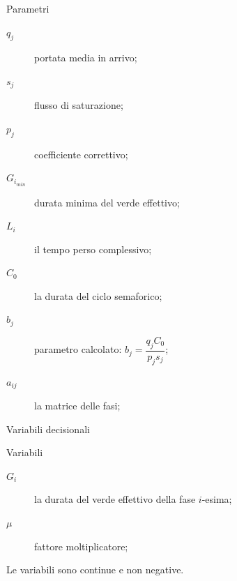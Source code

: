 \documentclass{beamer}
\begin{document}
 \begin{frame}{Parametri}
		\begin{description}
			\item[$q_j$] portata media in arrivo;
			\item[$s_j$] flusso di saturazione;
			\item[$p_j$] coefficiente correttivo;
			\item[$G_{i_{min}}$] durata minima del verde effettivo;
			\item[$L_i$] il tempo perso complessivo;
			\item[$C_0$] la durata del ciclo semaforico;
			\item[$b_j$] parametro calcolato: $b_j = \dfrac{q_j C_0}{p_j s_j}$;	
			\item[$a_{ij}$] la matrice delle fasi;
		\end{description}
\end{frame}

\begin{frame}{Variabili decisionali}
\begin{block}{Variabili}
	\begin{description}
		\item[$G_i$] la durata del verde effettivo della fase $i$-esima;
		\item[$\mu$] fattore moltiplicatore;
	\end{description}
\end{block}

  Le variabili sono continue e non negative.

\end{frame}
\end{document}
